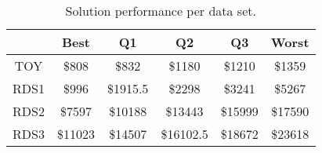 \begin{table}
\footnotesize
\caption{Solution performance per data set.}
\centering
\begin{tabular}{c||c|c|c|c|c}
\hline \hline
                 & Best                 & Q1                 & Q2                & Q3                & Worst \\ 
\hline
TOY & \$808   & \$832   & \$1180  & \$1210  & \$1359 \\
\hline
RDS1 & \$996   & \$1915.5   & \$2298  & \$3241  & \$5267 \\
\hline
RDS2 & \$7597   & \$10188   & \$13443  & \$15999  & \$17590 \\
\hline
RDS3 & \$11023   & \$14507   & \$16102.5  & \$18672  & \$23618 \\
\end{tabular} 
\label{table:result} 
\end{table}